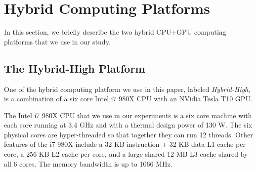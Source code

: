 \documentclass[11pt]{article}
\newcommand{\ignore}[1] {}
\begin{document}
\section{Hybrid Computing Platforms}
\label{sec:prelim}
In this section, we briefly describe the two hybrid CPU+GPU computing
platforms that we use in our study.
\ignore {
\subsection{A Brief Overview of NVidia GPUs}
\label{sec:gpu}
Nvidia's unified architecture  for its current line 
of GPUs supports both graphics and general computing. In general
purpose computing, 
the GPU is viewed as a massively multi-threaded architecture containing
hundreds of processing elements ({\em cores}). Each core comes with a
four stage pipeline. Eight cores, also known as {\em Symmetric Processors} (SPs)
are grouped in an SIMD fashion into a
{\em Symmetric Multiprocessor} (SM), so that each core in an SM executes
the same instruction.  Each core can store a
number of thread contexts. Data fetch latencies are tolerated by
switching between threads. Nvidia features a zero-overhead scheduling system
by quick switching of thread contexts in the hardware.


The GPU also has various memory types at each level. A set of
32-bit registers is evenly divided among the threads in each SM.
16 Kilobyte of {\em shared memory} per SM acts as a user-managed
cache and is available for all the threads in a Block. The GTX
280 is equipped with 1 GB of off-chip {\em global memory} which can be
accessed by all the threads in the grid, but may incur
hundreds of cycles of latency for each fetch/store. 
}


\subsection{The Hybrid-High Platform}
One of the hybrid computing platform we use in this paper, labeled {\em
Hybrid-High}, is a combination of a six core Intel i7 980X CPU with an
NVidia Tesla T10 GPU. 

The Intel i7 980X CPU that we use in our experiments is a six
core machine with each core running at 3.4 GHz and with a thermal
design power of 130 W. The six physical cores are hyper-threaded so
that together they can run 12 threads. Other features of the i7 980X include
a 32 KB instruction + 32 KB data L1 cache per core, a 256 KB L2 cache
per core, and a large shared 12 MB L3 cache shared by all 6 cores. The
memory bandwidth is up to 1066 MHz. 
\end{document}
